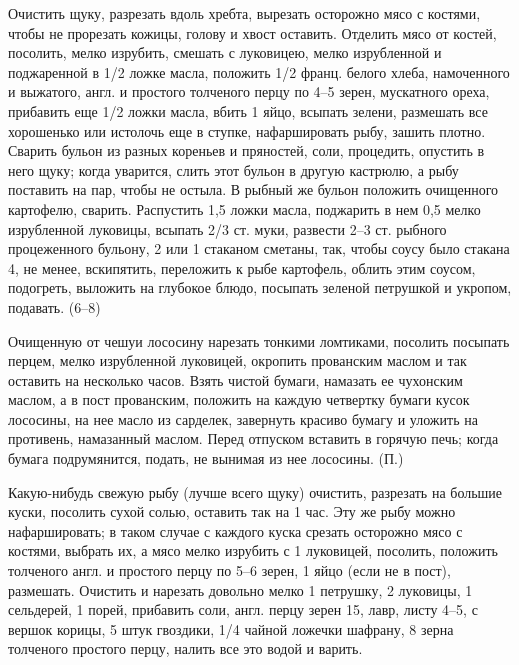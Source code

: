 Очистить щуку, разрезать вдоль хребта, вырезать осторожно мясо с костями, чтобы не прорезать кожицы, голову и хвост оставить. Отделить мясо от костей, посолить, мелко изрубить, смешать с луковицею, мелко изрубленной и поджаренной в 1/2 ложке масла, положить 1/2 франц. белого хлеба, намоченного и выжатого, англ. и простого толченого перцу по 4--5 зерен, мускатного ореха, прибавить еще 1/2 ложки масла, вбить 1 яйцо, всыпать зелени, размешать все хорошенько или истолочь еще в ступке, нафаршировать рыбу, зашить плотно. Сварить бульон из разных кореньев и пряностей, соли, процедить, опустить в него щуку; когда уварится, слить этот бульон в другую кастрюлю, а рыбу поставить на пар, чтобы не остыла. В рыбный же бульон положить очищенного картофелю, сварить. Распустить 1,5 ложки масла, поджарить в нем 0,5 мелко изрубленной луковицы, всыпать 2/3 ст. муки, развести 2--3 ст. рыбного процеженного бульону, 2 или 1 стаканом сметаны, так, чтобы соусу было стакана 4, не менее, вскипятить, переложить к рыбе картофель, облить этим соусом, подогреть, выложить на глубокое блюдо, посыпать зеленой петрушкой и укропом, подавать. (6--8) 


Очищенную от чешуи лососину нарезать тонкими ломтиками, посолить посыпать перцем, мелко изрубленной луковицей, окропить прованским маслом и так оставить на несколько часов. Взять чистой бумаги, намазать ее чухонским маслом, а в пост прованским, положить на каждую четвертку бумаги кусок лососины, на нее масло из сарделек, завернуть красиво бумагу и уложить на противень, намазанный маслом. Перед отпуском вставить в горячую печь; когда бумага подрумянится, подать, не вынимая из нее лососины. (П.) 


Какую-нибудь свежую рыбу (лучше всего щуку) очистить, разрезать на большие куски, посолить сухой солью, оставить так на 1 час. Эту же рыбу можно нафаршировать; в таком случае с каждого куска срезать осторожно мясо с костями, выбрать их, а мясо мелко изрубить с 1 луковицей, посолить, положить толченого англ. и простого перцу по 5--6 зерен, 1 яйцо (если не в пост), размешать. Очистить и нарезать довольно мелко 1 петрушку, 2 луковицы, 1 сельдерей, 1 порей, прибавить соли, англ. перцу зерен 15, лавр, листу 4--5, с вершок корицы, 5 штук гвоздики, 1/4 чайной ложечки шафрану, 8 зерна толченого простого перцу, налить все это водой и варить. 

